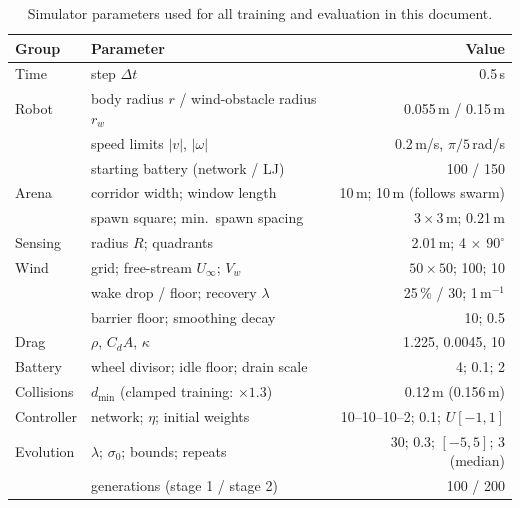 \documentclass[11pt]{article}
\begin{document}
\begin{table}[h]
\centering
\caption{Simulator parameters used for all training and evaluation in this document.}
\label{tab:sim-params}
\begin{tabular}{@{}llr@{}}
\toprule
Group & Parameter & Value \\
\midrule
Time & step $\Delta t$ & 0.5\,s \\
Robot & body radius $r$ / wind-obstacle radius $r_w$ & 0.055\,m / 0.15\,m \\
 & speed limits $|v|$, $|\omega|$ & 0.2\,m/s, $\pi/5$\,rad/s \\
 & starting battery (network / LJ) & 100 / 150 \\
Arena & corridor width; window length & 10\,m; 10\,m (follows swarm) \\
 & spawn square; min.\ spawn spacing & $3\times3$\,m; 0.21\,m \\
Sensing & radius $R$; quadrants & 2.01\,m; 4 $\times$ $90^\circ$ \\
Wind & grid; free-stream $U_\infty$; $V_w$ & $50\times50$; 100; 10 \\
 & wake drop / floor; recovery $\lambda$ & 25\,\% / 30; 1\,m$^{-1}$ \\
 & barrier floor; smoothing decay & 10; 0.5 \\
Drag & $\rho$, $C_dA$, $\kappa$ & 1.225, 0.0045, 10 \\
Battery & wheel divisor; idle floor; drain scale & 4; 0.1; 2 \\
Collisions & $d_{\min}$ (clamped training: $\times1.3$) & 0.12\,m (0.156\,m) \\
Controller & network; $\eta$; initial weights & 10--10--10--2; 0.1; $U[-1,1]$ \\
Evolution & $\lambda$; $\sigma_0$; bounds; repeats & 30; 0.3; $[-5,5]$; 3 (median) \\
 & generations (stage 1 / stage 2) & 100 / 200 \\
\bottomrule
\end{tabular}
\end{table}
\end{document}
